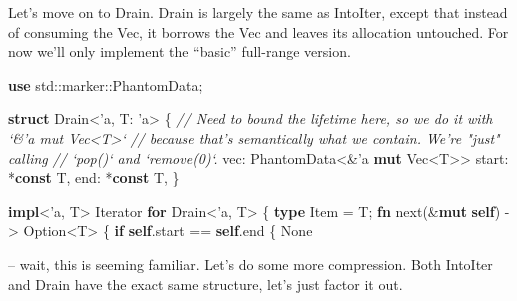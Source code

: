 \documentclass[a4paper,]{book}
\newenvironment{Shaded}{\begin{snugshade}}{\end{snugshade}}
\newcommand{\KeywordTok}[1]{\textcolor[rgb]{0.13,0.29,0.53}{\textbf{{#1}}}}
\newcommand{\DataTypeTok}[1]{\textcolor[rgb]{0.13,0.29,0.53}{{#1}}}
\newcommand{\ConstantTok}[1]{\textcolor[rgb]{0.00,0.00,0.00}{{#1}}}
\newcommand{\CommentTok}[1]{\textcolor[rgb]{0.56,0.35,0.01}{\textit{{#1}}}}
\newcommand{\OtherTok}[1]{\textcolor[rgb]{0.56,0.35,0.01}{{#1}}}
\newcommand{\BuiltInTok}[1]{{#1}}
\newcommand{\NormalTok}[1]{{#1}}
\begin{document}
Let's move on to Drain. Drain is largely the same as IntoIter, except
that instead of consuming the Vec, it borrows the Vec and leaves its
allocation untouched. For now we'll only implement the ``basic''
full-range version.

\begin{Shaded}
\begin{Highlighting}[]
\KeywordTok{use} \NormalTok{std::marker::PhantomData;}

\KeywordTok{struct} \NormalTok{Drain<}\OtherTok{'a}\NormalTok{, T: }\OtherTok{'a}\NormalTok{> \{}
    \CommentTok{// Need to bound the lifetime here, so we do it with `&'a mut Vec<T>`}
    \CommentTok{// because that's semantically what we contain. We're "just" calling}
    \CommentTok{// `pop()` and `remove(0)`.}
    \NormalTok{vec: PhantomData<&}\OtherTok{'a} \KeywordTok{mut} \DataTypeTok{Vec}\NormalTok{<T>>}
    \NormalTok{start: *}\KeywordTok{const} \NormalTok{T,}
    \NormalTok{end: *}\KeywordTok{const} \NormalTok{T,}
\NormalTok{\}}

\KeywordTok{impl}\NormalTok{<}\OtherTok{'a}\NormalTok{, T> }\BuiltInTok{Iterator} \KeywordTok{for} \NormalTok{Drain<}\OtherTok{'a}\NormalTok{, T> \{}
    \KeywordTok{type} \NormalTok{Item = T;}
    \KeywordTok{fn} \NormalTok{next(&}\KeywordTok{mut} \KeywordTok{self}\NormalTok{) -> }\DataTypeTok{Option}\NormalTok{<T> \{}
        \KeywordTok{if} \KeywordTok{self}\NormalTok{.start == }\KeywordTok{self}\NormalTok{.end \{}
            \ConstantTok{None}
\end{Highlighting}
\end{Shaded}

-- wait, this is seeming familiar. Let's do some more compression. Both
IntoIter and Drain have the exact same structure, let's just factor it
out.
\end{document}
